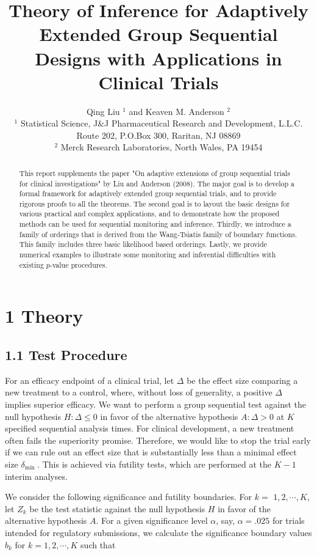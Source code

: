 \documentclass[10pt]{article}
\title{Theory of Inference for Adaptively Extended Group Sequential Designs with Applications in Clinical Trials}
\author{Qing Liu ${ }^{1}$ and Keaven M. Anderson ${ }^{2}$\\
${ }^{1}$ Statistical Science, J\&J Pharmaceutical Research and Development, L.L.C. Route 202, P.O.Box 300, Raritan, NJ 08869\\
${ }^{2}$ Merck Research Laboratories, North Wales, PA 19454}
\date{}
\begin{document}
\maketitle
\captionsetup{singlelinecheck=false}


\begin{abstract}
This report supplements the paper "On adaptive extensions of group sequential trials for clinical investigations" by Liu and Anderson (2008). The major goal is to develop a formal framework for adaptively extended group sequential trials, and to provide rigorous proofs to all the theorems. The second goal is to layout the basic designs for various practical and complex applications, and to demonstrate how the proposed methods can be used for sequential monitoring and inference. Thirdly, we introduce a family of orderings that is derived from the Wang-Tsiatis family of boundary functions. This family includes three basic likelihood based orderings. Lastly, we provide numerical examples to illustrate some monitoring and inferential difficulties with existing $p$-value procedures.
\end{abstract}

\section*{1 Theory}
\subsection*{1.1 Test Procedure}
For an efficacy endpoint of a clinical trial, let $\Delta$ be the effect size comparing a new treatment to a control, where, without loss of generality, a positive $\Delta$\\
implies superior efficacy. We want to perform a group sequential test against the null hypothesis $H: \Delta \leq 0$ in favor of the alternative hypothesis $A: \Delta>0$ at $K$ specified sequential analysis times. For clinical development, a new treatment often fails the superiority promise. Therefore, we would like to stop the trial early if we can rule out an effect size that is substantially less than a minimal effect size $\delta_{\text {min }}$. This is achieved via futility tests, which are performed at the $K-1$ interim analyses.

We consider the following significance and futility boundaries. For $k=$ $1,2, \cdots, K$, let $Z_{k}$ be the test statistic against the null hypothesis $H$ in favor of the alternative hypothesis $A$. For a given significance level $\alpha$, say, $\alpha=.025$ for trials intended for regulatory submissions, we calculate the significance boundary values $b_{k}$ for $k=1,2, \cdots, K$ such that
\end{document}
